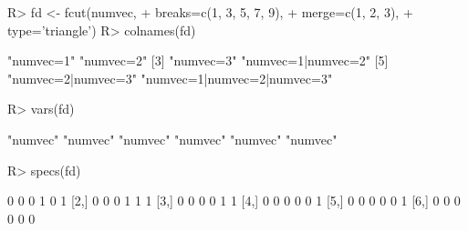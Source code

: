 \begin{Schunk}
% --begin: "fcut.varsspecs"
\begin{Sinput}
R> fd <- fcut(numvec,
+             breaks=c(1, 3, 5, 7, 9),
+             merge=c(1, 2, 3),
+             type='triangle')
R> colnames(fd)
\end{Sinput}
\begin{Soutput}
[1] "numvec=1"                   "numvec=2"                  
[3] "numvec=3"                   "numvec=1|numvec=2"         
[5] "numvec=2|numvec=3"          "numvec=1|numvec=2|numvec=3"
\end{Soutput}
\begin{Sinput}
R> vars(fd)
\end{Sinput}
\begin{Soutput}
[1] "numvec" "numvec" "numvec" "numvec" "numvec" "numvec"
\end{Soutput}
\begin{Sinput}
R> specs(fd)
\end{Sinput}
\begin{Soutput}
     [,1] [,2] [,3] [,4] [,5] [,6]
[1,]    0    0    0    1    0    1
[2,]    0    0    0    1    1    1
[3,]    0    0    0    0    1    1
[4,]    0    0    0    0    0    1
[5,]    0    0    0    0    0    1
[6,]    0    0    0    0    0    0
\end{Soutput}
%
% --end: "fcut.varsspecs"
\end{Schunk}
